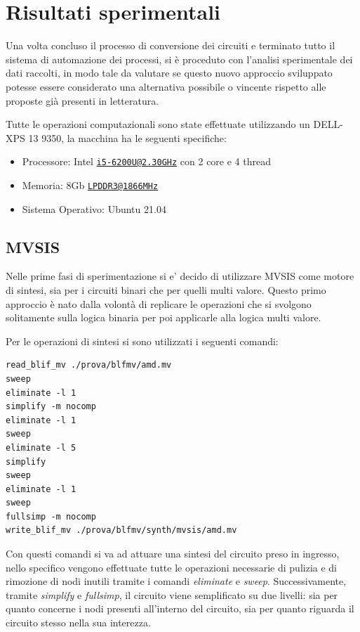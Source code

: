 \documentclass[italian,]{book}
\providecommand{\tightlist}{%
  \setlength{\itemsep}{0pt}\setlength{\parskip}{0pt}}
\begin{document}
\hypertarget{risultati-sperimentali}{%
\chapter{Risultati sperimentali}\label{risultati-sperimentali}}

Una volta concluso il processo di conversione dei circuiti e terminato tutto il sistema di automazione dei processi, si è proceduto con l'analisi sperimentale dei dati raccolti, in modo tale da valutare se questo nuovo approccio sviluppato potesse essere considerato una alternativa possibile o vincente rispetto alle proposte già presenti in letteratura.

Tutte le operazioni computazionali sono state effettuate utilizzando un DELL-XPS 13 9350, la macchina ha le seguenti specifiche:

\begin{itemize}
\tightlist
\item
  Processore: Intel \href{mailto:i5-6200U@2.30GHz}{\nolinkurl{i5-6200U@2.30GHz}} con 2 core e 4 thread
\item
  Memoria: 8Gb \href{mailto:LPDDR3@1866MHz}{\nolinkurl{LPDDR3@1866MHz}}
\item
  Sistema Operativo: Ubuntu 21.04
\end{itemize}

\newpage

\hypertarget{mvsis-2}{%
\section{MVSIS}\label{mvsis-2}}

Nelle prime fasi di sperimentazione si e' decido di utilizzare MVSIS come motore di sintesi, sia per i circuiti binari che per quelli multi valore. Questo primo approccio è nato dalla volontà di replicare le operazioni che si svolgono solitamente sulla logica binaria per poi applicarle alla logica multi valore.

Per le operazioni di sintesi si sono utilizzati i seguenti comandi:

\begin{verbatim}
read_blif_mv ./prova/blfmv/amd.mv
sweep
eliminate -l 1
simplify -m nocomp
eliminate -l 1
sweep
eliminate -l 5
simplify
sweep
eliminate -l 1
sweep
fullsimp -m nocomp
write_blif_mv ./prova/blfmv/synth/mvsis/amd.mv
\end{verbatim}

Con questi comandi si va ad attuare una sintesi del circuito preso in ingresso, nello specifico vengono effettuate tutte le operazioni necessarie di pulizia e di rimozione di nodi inutili tramite i comandi \emph{eliminate} e \emph{sweep}. Successivamente, tramite \emph{simplify} e \emph{fullsimp}, il circuito viene semplificato su due livelli: sia per quanto concerne i nodi presenti all'interno del circuito, sia per quanto riguarda il circuito stesso nella sua interezza.
\end{document}

